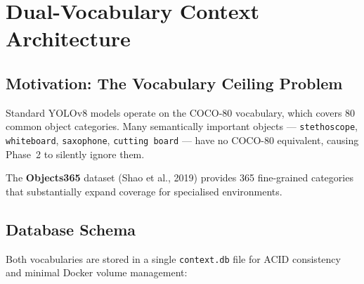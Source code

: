 \documentclass[12pt,a4paper]{article}
\begin{document}
\section{Dual-Vocabulary Context Architecture}

\subsection{Motivation: The Vocabulary Ceiling Problem}

Standard YOLOv8 models operate on the COCO-80 vocabulary, which covers 80
common object categories. Many semantically important objects — \texttt{stethoscope},
\texttt{whiteboard}, \texttt{saxophone}, \texttt{cutting board} — have no COCO-80
equivalent, causing Phase~2 to silently ignore them.

The \textbf{Objects365} dataset (Shao et al., 2019) provides 365 fine-grained
categories that substantially expand coverage for specialised environments.

\subsection{Database Schema}

Both vocabularies are stored in a single \texttt{context.db} file for ACID
consistency and minimal Docker volume management:
\end{document}
